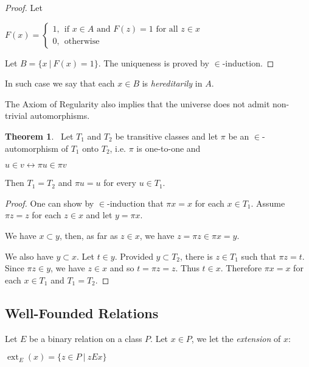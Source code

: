 \documentclass[8pt]{article}
\theoremstyle{definition}
\theoremstyle{definition}
\newtheorem{theorem}{Theorem}[section]
\theoremstyle{definition}
\theoremstyle{definition}
\theoremstyle{definition}
\theoremstyle{definition}
\theoremstyle{definition}
\theoremstyle{definition}
\theoremstyle{definition}
\theoremstyle{definition}
\theoremstyle{definition}
\theoremstyle{definition}
\theoremstyle{definition}
\theoremstyle{definition}
\theoremstyle{question}
\begin{document}
\begin{proof}
  Let
\begin{center}
  $F(x) =
  \begin{cases}
    1, \:\: \text{if $x \in A$ and $F(z) = 1$ for all $z \in x$} \\
    0, \:\: \text{otherwise}
  \end{cases}$
\end{center}

Let $B = \{ x \: |\: F(x) = 1 \}$. The uniqueness is proved by $\in$-induction.
\end{proof}

In such case we say that each $x \in B$ is \emph{hereditarily} in $A$.

The Axiom of Regularity also implies that the universe does not admit non-trivial automorphisms.

\begin{theorem}~\label{trivialautomors}
  Let $T_1$ and $T_2$ be transitive classes and let $\pi$ be an $\in$-automorphism
  of $T_1$ onto $T_2$, i.e. $\pi$ is one-to-one and
  \begin{center}
    $u \in v \leftrightarrow \pi u \in \pi v$
  \end{center}

  Then $T_1 = T_2$ and $\pi u = u$ for every $u \in T_1$.
\end{theorem}
\begin{proof}
  One can show by $\in$-induction that $\pi x = x$ for each $x \in T_1$.
  Assume $\pi z = z$ for each $z \in x$ and let $y = \pi x$.

  We have $x \subset y$, then, as far as $z \in x$, we have $z = \pi z \in \pi x = y$.

  We also have $y \subset x$. Let $t \in y$. Provided $y \subset T_2$, there is
  $z \in T_1$ such that $\pi z = t$. Since $\pi z \in y$, we have $z \in x$ and so
  $t = \pi z = z$. Thus $t \in x$.
  Therefore $\pi x = x$ for each $x \in T_1$ and $T_1 = T_2$.
\end{proof}

\subsection{Well-Founded Relations}

Let $E$ be a binary relation on a class $P$. Let $x \in P$, we let the \emph{extension} of $x$:
\begin{center}
  $\operatorname{ext}_E(x) = \{ z \in P \: | \: z E x \}$
\end{center}
\end{document}
